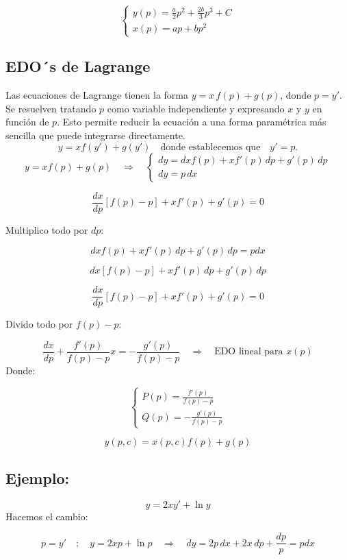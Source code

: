 \documentclass[a4paper,12pt]{article}
\begin{document}
\[
\begin{cases}
y(p) = \frac{a}{2}p^2 + \frac{2b}{3} p^3 + C \\[6pt]
x(p) = ap + bp^2
\end{cases}
\]

\subsection{EDO´s de Lagrange}
\noindent
Las ecuaciones de Lagrange tienen la forma $y = x\,f(p) + g(p)$, donde $p = y'$. 
Se resuelven tratando $p$ como variable independiente y expresando $x$ y $y$ en función de $p$. 
Esto permite reducir la ecuación a una forma paramétrica más sencilla que puede integrarse directamente.
\[
y = x f(y') + g(y') \quad\text{donde establecemos que} \quad y' = p.
\]
\[
y = x f(p) + g(p) \quad \Rightarrow \quad 
\begin{cases}
dy = dxf(p) + x f'(p)\, dp + g'(p)\, dp \\[4pt]
dy = p\, dx
\end{cases}
\]

\[
\frac{dx}{dp} [f(p) - p] + x f'(p) + g'(p) = 0
\]

\newpage
\noindent
Multiplico todo por \(dp\):

\[
dxf(p) + x f'(p)\, dp + g'(p)\, dp = pdx
\]

\[
dx[f(p) - p] + x f'(p)\, dp + g'(p)\, dp
\]

\[
\frac{dx}{dp} [f(p) - p] + x f'(p) + g'(p) = 0
\]

\medskip
\noindent
Divido todo por \(f(p) - p\):

\[
\frac{dx}{dp} + \frac{f'(p)}{f(p) - p} x = - \frac{g'(p)}{f(p) - p} 
\quad \Rightarrow \quad \text{EDO lineal para } x(p)
\]
Donde:

\[
\begin{cases}
P(p) = \frac{f'(p)}{f(p) - p} \\[10pt]
Q(p) = -\frac{g'(p)}{f(p) - p}
\end{cases}
\]

\[
y(p,c) = x(p,c) f(p) + g(p)
\]
\subsection*{Ejemplo:}
\vspace{-1.2em}
\[
y = 2xy' + \ln y
\]
Hacemos el cambio:

\[
p = y' \quad ; \quad y = 2xp + \ln p \quad \Rightarrow \quad dy = 2p\, dx + 2x\, dp + \frac{dp}{p} = pdx
\]
\end{document}
